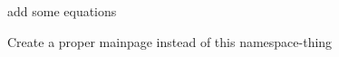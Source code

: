 
\begin{DoxyRefList}
\item[\label{todo__todo000001}%
\hypertarget{todo__todo000001}{}%
Page \hyperlink{md_README}{Logarithmic\+\_\+\+Strain\+\_\+\+Space-\/dealii} ]add some equations

Create a proper mainpage instead of this namespace-\/thing
\end{DoxyRefList}